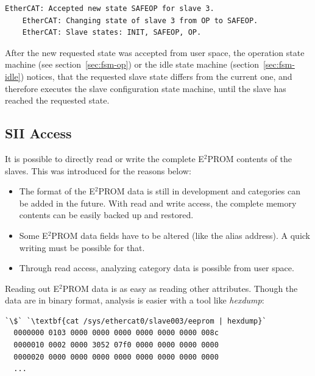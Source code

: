 \documentclass[a4paper,12pt,BCOR6mm,bibtotoc,idxtotoc]{scrbook}
\begin{document}
\begin{description}
  \begin{lstlisting}[gobble=4]
    EtherCAT: Accepted new state SAFEOP for slave 3.
    EtherCAT: Changing state of slave 3 from OP to SAFEOP.
    EtherCAT: Slave states: INIT, SAFEOP, OP.
  \end{lstlisting}

  After the new requested state was accepted from user space, the
  operation state machine (see section~\ref{sec:fsm-op}) or the idle
  state machine (section~\ref{sec:fsm-idle}) notices, that the
  requested slave state differs from the current one, and therefore
  executes the slave configuration state machine, until the slave has
  reached the requested state.
\end{description}


\subsection{SII Access}
\label{sec:siiaccess}

It is possible to directly read or write the complete E$^2$PROM
contents of the slaves. This was introduced for the reasons below:

\begin{itemize}
\item The format of the E$^2$PROM data is still in development and
  categories can be added in the future. With read and write access,
  the complete memory contents can be easily backed up and restored.
\item Some E$^2$PROM data fields have to be altered (like the alias
  address). A quick writing must be possible for that.
\item Through read access, analyzing category data is possible from
  user space.
\end{itemize}

Reading out E$^2$PROM data is as easy as reading other attributes. Though the
data are in binary format, analysis is easier with a tool like
\textit{hexdump}:

\begin{lstlisting}[gobble=2]
  `\$` `\textbf{cat /sys/ethercat0/slave003/eeprom | hexdump}`
  0000000 0103 0000 0000 0000 0000 0000 0000 008c
  0000010 0002 0000 3052 07f0 0000 0000 0000 0000
  0000020 0000 0000 0000 0000 0000 0000 0000 0000
  ...
\end{lstlisting}
\end{document}
